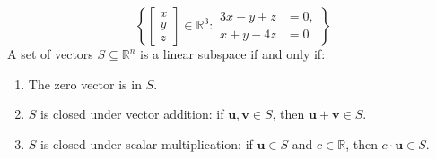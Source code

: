 \[
    \left\{
    \begin{bmatrix}
    x \\ y \\ z
    \end{bmatrix}
    \in \mathbb{R}^3 : 
    \begin{aligned}
    3x - y + z &= 0, \\
    x + y - 4z &= 0
    \end{aligned}
    \right\}
\]
A set of vectors \( S \subseteq \mathbb{R}^n \) is a linear subspace if and only if:
\begin{enumerate}
    \item The zero vector is in \( S \).
    \item \( S \) is closed under vector addition: if \( \mathbf{u}, \mathbf{v} \in S \), then \( \mathbf{u} + \mathbf{v} \in S \).
    \item \( S \) is closed under scalar multiplication: if \( \mathbf{u} \in S \) and \( c \in \mathbb{R} \), then \( c \cdot \mathbf{u} \in S \).
\end{enumerate}


